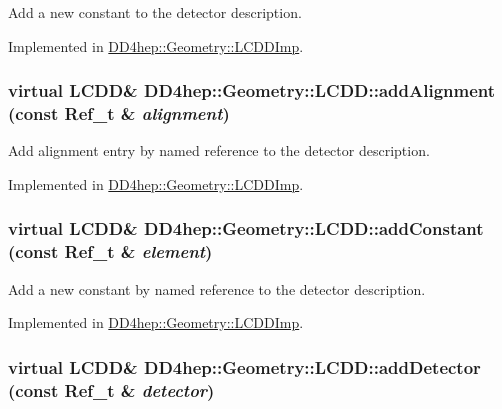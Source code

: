 Add a new constant to the detector description. 

Implemented in \hyperlink{class_d_d4hep_1_1_geometry_1_1_l_c_d_d_imp_aad80a2a7fab34d16dfdc2da299076dab}{DD4hep::Geometry::LCDDImp}.\hypertarget{class_d_d4hep_1_1_geometry_1_1_l_c_d_d_a50e3654851b950da20f19a13e36fbcc4}{
\subsubsection[{addAlignment}]{\setlength{\rightskip}{0pt plus 5cm}virtual {\bf LCDD}\& DD4hep::Geometry::LCDD::addAlignment (const {\bf Ref\_\-t} \& {\em alignment})}}
\label{class_d_d4hep_1_1_geometry_1_1_l_c_d_d_a50e3654851b950da20f19a13e36fbcc4}


Add alignment entry by named reference to the detector description. 

Implemented in \hyperlink{class_d_d4hep_1_1_geometry_1_1_l_c_d_d_imp_a408e628b36591e17b7f44f7c3246be39}{DD4hep::Geometry::LCDDImp}.\hypertarget{class_d_d4hep_1_1_geometry_1_1_l_c_d_d_ac2bc82eba942bd452da56bbf958d8aad}{
\subsubsection[{addConstant}]{\setlength{\rightskip}{0pt plus 5cm}virtual {\bf LCDD}\& DD4hep::Geometry::LCDD::addConstant (const {\bf Ref\_\-t} \& {\em element})}}
\label{class_d_d4hep_1_1_geometry_1_1_l_c_d_d_ac2bc82eba942bd452da56bbf958d8aad}


Add a new constant by named reference to the detector description. 

Implemented in \hyperlink{class_d_d4hep_1_1_geometry_1_1_l_c_d_d_imp_aec684bd86c26b609a33668364f595d96}{DD4hep::Geometry::LCDDImp}.\hypertarget{class_d_d4hep_1_1_geometry_1_1_l_c_d_d_a53a88518d0ab797a11bd61f9c567f7ac}{
\subsubsection[{addDetector}]{\setlength{\rightskip}{0pt plus 5cm}virtual {\bf LCDD}\& DD4hep::Geometry::LCDD::addDetector (const {\bf Ref\_\-t} \& {\em detector})}}
\label{class_d_d4hep_1_1_geometry_1_1_l_c_d_d_a53a88518d0ab797a11bd61f9c567f7ac}


